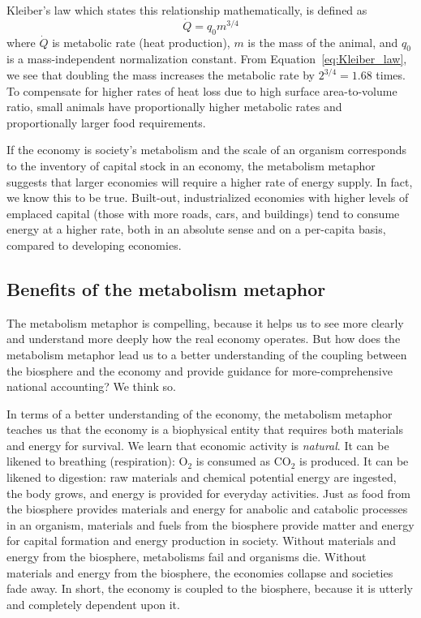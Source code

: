Kleiber's law which states this relationship mathematically,
is defined as
%
\begin{equation}\label{eq:Kleiber_law}
	\dot{Q} = q_{0} m^{3/4}
\end{equation}
%
where 
$\dot{Q}$ is metabolic rate (heat production),
$m$ is the mass of the animal, and
$q_{0}$ is a mass-independent normalization constant.
From Equation~\ref{eq:Kleiber_law},
we see that doubling the mass increases the metabolic rate by
$2^{3/4} = 1.68$ times.
To compensate for higher rates of heat loss due to high surface area-to-volume ratio,
small animals have proportionally higher metabolic rates
and proportionally larger food requirements.

If the economy is society's metabolism and 
the scale of an organism corresponds to the inventory 
of capital stock in an economy, 
the metabolism metaphor suggests that larger economies 
will require a higher rate of energy supply.
In fact, we know this to be true.
Built-out, industrialized economies with higher levels of emplaced capital
(those with more roads, cars, and buildings)
tend to consume energy at a higher rate, 
both in an absolute sense and on a per-capita basis,
compared to developing economies.


\subsection{Benefits of the metabolism metaphor}
\label{sec:metabolism_helps}

The metabolism metaphor is compelling, 
because it helps us to see more clearly
and understand more deeply
how the real economy operates.
But how does the metabolism metaphor lead us to a better understanding 
of the coupling between the biosphere and the economy 
and provide guidance for more-comprehensive national accounting?
We think so.

In terms of a better understanding of the economy, 
the metabolism metaphor teaches us that the economy is a biophysical entity
that requires both materials and energy for survival.
We learn that economic activity is \emph{natural}.
It can be likened to breathing (respiration): 
O$_2$ is consumed as CO$_2$ is produced.
It can be likened to digestion:
raw materials and chemical potential energy are ingested, 
the body grows, 
and energy is provided for everyday activities.
Just as food from the biosphere provides materials and energy for
anabolic and catabolic processes in an organism, 
materials and fuels from the biosphere provide matter and energy for
capital formation and energy production in society.
Without materials and energy from the biosphere, 
metabolisms fail and organisms die. 
Without materials and energy from the biosphere,
the economies collapse and societies fade away.
In short, the economy is coupled to the biosphere,
because it is utterly and completely dependent upon it.

